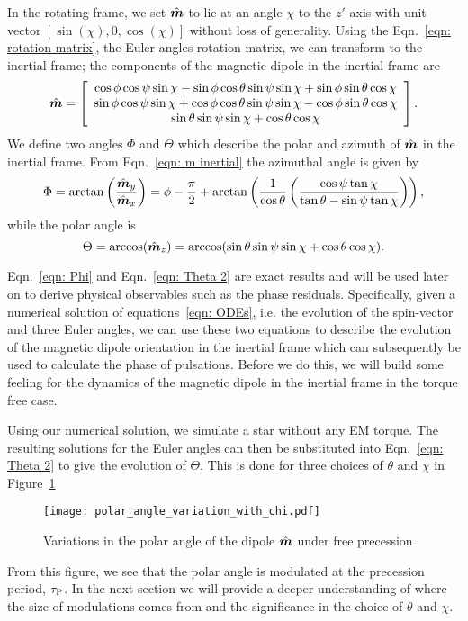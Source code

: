 \documentclass[../full_thesis/full_thesis.tex]{subfiles}
\begin{document}
In the rotating frame, we set $\hat{\boldsymbol{m}}$ to lie at an angle $\chi$ to the $z'$ axis
with unit vector $[\sin(\chi), 0, \cos(\chi)]$ without loss of generality.
Using the Eqn.~\eqref{eqn: rotation matrix}, the Euler angles
rotation matrix, we can transform to the inertial frame; the components of the
magnetic dipole in the inertial frame are
\begin{equation}
\hat{\boldsymbol{m}} =
\left[\begin{array}{c}
\cos\phi\cos\psi\sin\chi - \sin\phi \cos \theta \sin \psi \sin \chi
+ \sin \phi \sin \theta \cos \chi \\
\sin\phi\cos\psi\sin\chi + \cos\phi \cos \theta \sin \psi \sin \chi
- \cos \phi \sin \theta \cos \chi \\
\sin\theta \sin\psi \sin\chi + \cos\theta \cos \chi
\end{array}\right].
\label{eqn: m inertial}
\end{equation}
We define two angles $\Phi$ and $\Theta$
which describe the polar and azimuth of $\hat{\boldsymbol{m}}$ in the inertial frame.
From Eqn.~\eqref{eqn: m inertial} the azimuthal angle is given by
\begin{equation}
    \Phi = \arctan\left(\frac{\hat{\boldsymbol{m}}_{y}}{\hat{\boldsymbol{m}}_{x}}\right) =
\phi - \frac{\pi}{2} + \arctan\left(\frac{1}{\cos\theta}
                       \left(\frac{\cos\psi \tan \chi}{\tan\theta -
                       \sin \psi \tan\chi }\right)\right),
\label{eqn: Phi}
\end{equation}
while the polar angle is
\begin{equation}
\Theta = \arccos(\hat{\boldsymbol{m}}_{z}) = \arccos(\sin \theta \sin \psi \sin \chi + \cos \theta \cos \chi ).
\label{eqn: Theta 2}
\end{equation}

Eqn.~\eqref{eqn: Phi} and Eqn.~\eqref{eqn: Theta 2} are exact results and will
be used later on to derive physical observables such as the phase residuals.
Specifically, given a numerical solution of equations~\eqref{eqn: ODEs}, i.e.
the evolution of the spin-vector and three Euler angles, we can use these two
equations to describe the evolution of the magnetic dipole orientation in the
inertial frame which can subsequently be used to calculate the phase of
pulsations. Before we do this, we will build some feeling for the dynamics of
the magnetic dipole in the inertial frame in the torque free case.

Using our numerical solution, we simulate a star without any EM torque. The
resulting solutions for the Euler angles can then be substituted into Eqn.~\eqref{eqn: Theta 2}
to give the evolution of $\Theta$. This is done for three choices of $\theta$
and $\chi$ in Figure~\ref{fig: polar angle variations}
\begin{figure}[htb]
\centering
  \texttt{[image: polar\_angle\_variation\_with\_chi.pdf]}
\caption{Variations in the polar angle of the dipole $\hat{\boldsymbol{m}}$ under free precession}
\label{fig: polar angle variations}
\end{figure}
From this figure, we see that the polar angle is modulated at the precession
period, $\tau_{\mathrm{P}}$. In the next section we will provide a deeper understanding
of where the size of modulations comes from and the significance in the choice
of $\theta$ and $\chi$.
\end{document}
